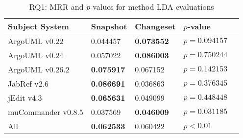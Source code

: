 
\begin{table}[t]
\renewcommand{\arraystretch}{1.3}
\footnotesize
\centering
\caption{RQ1: MRR and $p$-values for method LDA evaluations}
\begin{tabular}{l|ll|ll}
   \toprule
    Subject System & Snapshot        & Changeset       & $p$-value      \\
    \midrule

ArgoUML v0.22      & 0.044457        & {\bf 0.073552 } & $p = 0.094157$ \\
ArgoUML v0.24      & 0.057022        & {\bf 0.086003 } & $p = 0.750244$ \\
ArgoUML v0.26.2    & {\bf 0.075917 } & 0.067152        & $p = 0.142153$ \\
JabRef v2.6        & {\bf 0.086691 } & 0.036863        & $p = 0.376345$ \\
jEdit v4.3         & {\bf 0.065631 } & 0.049099        & $p = 0.448448$ \\
muCommander v0.8.5 & 0.037569        & {\bf 0.046009 } & $p = 0.031185$ \\
\midrule
All                & {\bf 0.062533 } & 0.060422        & $p < 0.01$     \\

    \bottomrule
\end{tabular}
\label{table:rq1:method:lda}
\end{table}

